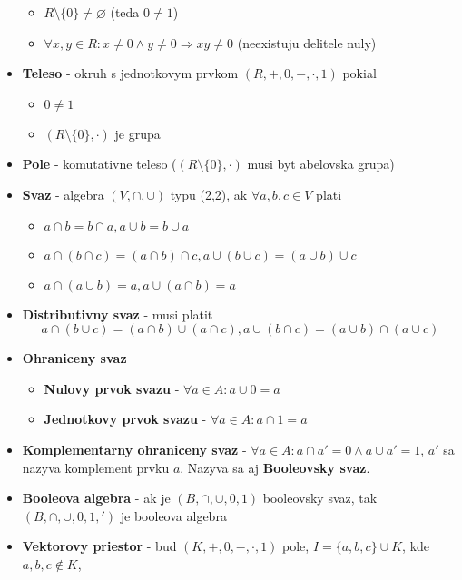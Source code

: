 \documentclass[12pt]{article}
\begin{document}
\begin{itemize}
		\begin{itemize}
			\item $R \setminus \{0\} \not= \varnothing$ (teda $0 \not= 1$)
			\item $\forall x,y \in R: x \not= 0 \land y \not= 0 \Rightarrow xy \not= 0$ (neexistuju delitele nuly)
		\end{itemize}
	\item \textbf{Teleso} - okruh s jednotkovym prvkom $(R,+,0,-,\cdot,1)$ pokial
		\begin{itemize}
			\item $0 \not= 1$
			\item $(R \setminus \{0\}, \cdot)$ je grupa
		\end{itemize}
	\item \textbf{Pole} - komutativne teleso ($(R \setminus \{0\}, \cdot)$ musi byt abelovska grupa)
	\item \textbf{Svaz} - algebra $(V,\cap,\cup)$ typu (2,2), ak $\forall a,b,c \in V$ plati
		\begin{itemize}
			\item $a \cap b = b \cap a, a \cup b = b \cup a$
			\item $a \cap (b \cap c) = (a \cap b) \cap c, a \cup (b \cup c) = (a \cup b) \cup c$
			\item $a \cap (a \cup b) = a, a \cup (a \cap b) = a$
		\end{itemize}
	\item \textbf{Distributivny svaz} - musi platit
		\begin{equation*}
			a \cap (b \cup c) = (a \cap b) \cup (a \cap c), a \cup (b \cap c) = (a \cup b) \cap (a \cup c)
		\end{equation*}
	\item \textbf{Ohraniceny svaz}
		\begin{itemize}
			\item \textbf{Nulovy prvok svazu} - $\forall a \in A: a \cup 0 = a$
			\item \textbf{Jednotkovy prvok svazu} - $\forall a \in A: a \cap 1 = a$
		\end{itemize}
	\item \textbf{Komplementarny ohraniceny svaz} - $\forall a \in A: a \cap a' = 0 \land a \cup a' = 1$,
		$a'$ sa nazyva komplement prvku $a$. Nazyva sa aj \textbf{Booleovsky svaz}.
	\item \textbf{Booleova algebra} - ak je $(B,\cap,\cup,0,1)$ booleovsky svaz, tak $(B,\cap,\cup,0,1,')$ je booleova
		algebra
	\item \textbf{Vektorovy priestor} - bud $(K,+,0,-,\cdot,1)$ pole, $I = \{a,b,c\} \cup K$, kde $a,b,c \not\in K$,

\end{itemize}
\end{document}
